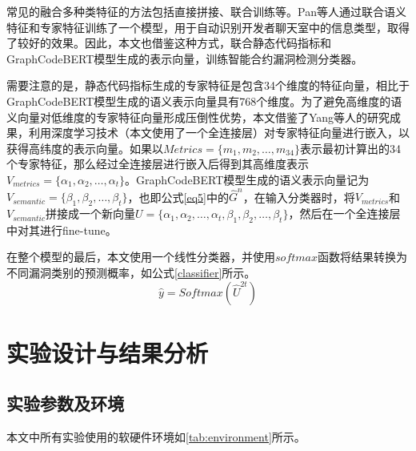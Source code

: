 常见的融合多种类特征的方法包括直接拼接、联合训练等。Pan等人通过联合语义特征和专家特征训练了一个模型，用于自动识别开发者聊天室中的信息类型，取得了较好的效果。因此，本文也借鉴这种方式，联合静态代码指标和GraphCodeBERT模型生成的表示向量，训练智能合约漏洞检测分类器。

需要注意的是，静态代码指标生成的专家特征是包含34个维度的特征向量，相比于GraphCodeBERT模型生成的语义表示向量具有768个维度。为了避免高维度的语义向量对低维度的专家特征向量形成压倒性优势，本文借鉴了Yang等人的研究成果，利用深度学习技术（本文使用了一个全连接层）对专家特征向量进行嵌入，以获得高纬度的表示向量。如果以$Metrics=\{m_1,m_2,\ldots,m_{34}\}$表示最初计算出的34个专家特征，那么经过全连接层进行嵌入后得到其高维度表示$V_{metrics}=\{\alpha_1,\alpha_2,\ldots,\alpha_t\}$。GraphCodeBERT模型生成的语义表示向量记为$V_{semantic}=\{\beta_1,\beta_2,\ldots,\beta_t\}$，也即公式\eqref{eq5}中的$\hat{G}^n$，在输入分类器时，将$V_{metrics}$和$V_{semantic}$拼接成一个新向量$U=\{\alpha_1,\alpha_2,\ldots,\alpha_t,\beta_1,\beta_2,\ldots,\beta_t\}$，然后在一个全连接层中对其进行fine-tune。

在整个模型的最后，本文使用一个线性分类器，并使用$softmax$函数将结果转换为不同漏洞类别的预测概率，如公式\eqref{classifier}所示。
\begin{equation}
\hat{y}=Softmax(\hat{U}^{2t}) \label{classifier}
\end{equation}
\section{实验设计与结果分析}
\label{sec:实验设计与结果分析}


\subsection{实验参数及环境}
\label{sec:实验参数及环境}
本文中所有实验使用的软硬件环境如\autoref{tab:environment}所示。

